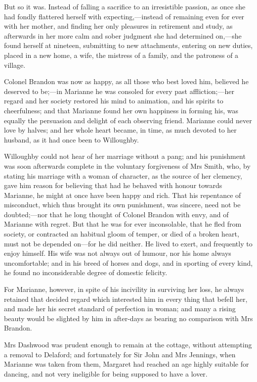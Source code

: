 But so it was. Instead of falling a sacrifice to an irresistible passion, as once she had fondly flattered herself with expecting,—instead of remaining even for ever with her mother, and finding her only pleasures in retirement and study, as afterwards in her more calm and sober judgment she had determined on,—she found herself at nineteen, submitting to new attachments, entering on new duties, placed in a new home, a wife, the mistress of a family, and the patroness of a village.

Colonel Brandon was now as happy, as all those who best loved him, believed he deserved to be;—in Marianne he was consoled for every past affliction;—her regard and her society restored his mind to animation, and his spirits to cheerfulness; and that Marianne found her own happiness in forming his, was equally the persuasion and delight of each observing friend. Marianne could never love by halves; and her whole heart became, in time, as much devoted to her husband, as it had once been to Willoughby.

Willoughby could not hear of her marriage without a pang; and his punishment was soon afterwards complete in the voluntary forgiveness of Mrs Smith, who, by stating his marriage with a woman of character, as the source of her clemency, gave him reason for believing that had he behaved with honour towards Marianne, he might at once have been happy and rich. That his repentance of misconduct, which thus brought its own punishment, was sincere, need not be doubted;—nor that he long thought of Colonel Brandon with envy, and of Marianne with regret. But that he was for ever inconsolable, that he fled from society, or contracted an habitual gloom of temper, or died of a broken heart, must not be depended on—for he did neither. He lived to exert, and frequently to enjoy himself. His wife was not always out of humour, nor his home always uncomfortable; and in his breed of horses and dogs, and in sporting of every kind, he found no inconsiderable degree of domestic felicity.

For Marianne, however, in spite of his incivility in surviving her loss, he always retained that decided regard which interested him in every thing that befell her, and made her his secret standard of perfection in woman; and many a rising beauty would be slighted by him in after-days as bearing no comparison with Mrs Brandon.

Mrs Dashwood was prudent enough to remain at the cottage, without attempting a removal to Delaford; and fortunately for Sir John and Mrs Jennings, when Marianne was taken from them, Margaret had reached an age highly suitable for dancing, and not very ineligible for being supposed to have a lover.

